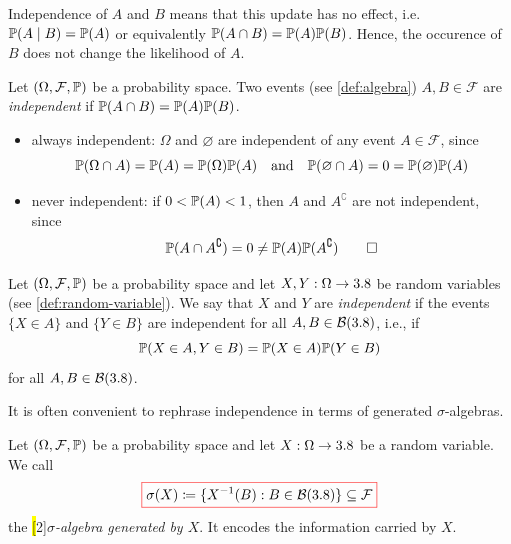Independence of $A$ and $B$ means that this update has no effect, i.e.
$
\mathbb{P}(A \mid B) = \mathbb{P}(A)
$
or equivalently
$
\mathbb{P}(A \cap B) = \mathbb{P}(A)  \mathbb{P}(B)
$.
Hence, the occurence of $B$ does not change the likelihood of $A$.

\begin{definition}
Let $(\Omega, \mathcal{F}, \mathbb{P})$ be a probability space.
Two events (see \autoref{def:algebra}) $A, B \in \mathcal{F}$ are \emph{independent} if $\mathbb{P}(A \cap B) = \mathbb{P}(A) \mathbb{P}(B)$.
\end{definition}

\begin{example}
\leavevmode
\begin{itemize}
\item always independent: $\Omega$ and $\varnothing$ are independent of any event $A \in \mathcal{F}$, since 
\[
\mathbb{P}(\Omega \cap A) = \mathbb{P}(A) = \mathbb{P}(\Omega) \mathbb{P}(A) \quad \text{and} \quad \mathbb{P}(\varnothing \cap A) = 0 = \mathbb{P}(\varnothing) \mathbb{P}(A)
\]
\item never independent: if $0 < \mathbb{P}(A) < 1$, then $A$ and $A^{\complement}$ are not independent, since 
\[
\mathbb{P}(A \cap A^{\complement}) = 0 \neq \mathbb{P}(A) \mathbb{P}(A^{\complement})
\qedhere
\]
\end{itemize}
\end{example}

\begin{definition}\label{def:independence-of-random-variables}
Let $(\Omega, \mathcal{F}, \mathbb{P})$ be a probability space and let $X, Y : \Omega \to 3.8$ be random variables (see \autoref{def:random-variable}).
We say that $X$ and $Y$ are \emph{independent} if the events $\{X \in A\}$ and $\{Y \in B\}$ are independent for all $A, B \in \mathcal{B}(3.8)$, i.e., if
\[
\mathbb{P}(X \in A, Y \in B) = \mathbb{P}(X \in A) \mathbb{P}(Y \in B)
\]
for all $A, B \in \mathcal{B}(3.8)$.
\end{definition}

It is often convenient to rephrase independence in terms of generated $\sigma$-algebras.
\begin{definition}\label{def:sigma-algebra-generated-by-random-variable}
Let $(\Omega, \mathcal{F}, \mathbb{P})$ be a probability space and let $X : \Omega \to 3.8$ be a random variable.
We call
\[
{\color{red}\boxed{\color{black}
\sigma(X) \coloneq \{X^{-1}(B) : B \in \mathcal{B}(3.8)\} \subseteq \mathcal{F}
}}
\]
the \hl[2]{\emph{$\sigma$-algebra generated by $X$}}.
It encodes the information carried by $X$. %
\end{definition}

